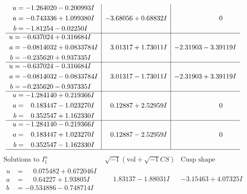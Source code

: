 \documentclass[1p]{elsarticle_modified}
\theoremstyle{definition}
\newcommand{\I}{\sqrt{-1}}
\begin{document}
$$\begin{array}{c|c|c}
\begin{aligned}
u &= -1.264020 - 0.200993 I \\
a &= -0.743336 + 1.099380 I \\
b &= -1.81254 - 0.02250 I\end{aligned}
 & -3.68056 + 0.68832 I & \phantom{-0.000000 } 0 \\ \hline\begin{aligned}
u &= -0.637024 + 0.316684 I \\
a &= -0.0814032 + 0.0833784 I \\
b &= -0.235620 + 0.937335 I\end{aligned}
 & \phantom{-}3.01317 + 1.73011 I & -2.31903 - 3.39119 I \\ \hline\begin{aligned}
u &= -0.637024 - 0.316684 I \\
a &= -0.0814032 - 0.0833784 I \\
b &= -0.235620 - 0.937335 I\end{aligned}
 & \phantom{-}3.01317 - 1.73011 I & -2.31903 + 3.39119 I \\ \hline\begin{aligned}
u &= -1.284140 + 0.219366 I \\
a &= \phantom{-}0.183447 - 1.023270 I \\
b &= \phantom{-}0.352547 + 1.162330 I\end{aligned}
 & \phantom{-}0.12887 + 2.52959 I & \phantom{-0.000000 } 0 \\ \hline\begin{aligned}
u &= -1.284140 - 0.219366 I \\
a &= \phantom{-}0.183447 + 1.023270 I \\
b &= \phantom{-}0.352547 - 1.162330 I\end{aligned}
 & \phantom{-}0.12887 - 2.52959 I & \phantom{-0.000000 } 0\\
 \hline 
 \end{array}$$\newpage$$\begin{array}{c|c|c}  
\text{Solutions to }I^u_{1}& \I (\text{vol} + \sqrt{-1}CS) & \text{Cusp shape}\\
 \hline 
\begin{aligned}
u &= \phantom{-}0.075482 + 0.672046 I \\
a &= \phantom{-}0.64227 + 1.93805 I \\
b &= -0.534886 - 0.748714 I\end{aligned}
 & \phantom{-}1.83137 - 1.88031 I & -3.15463 + 4.07325 I \\ \hline\begin{aligned}

\end{aligned}
\end{array}$$
\end{document}
